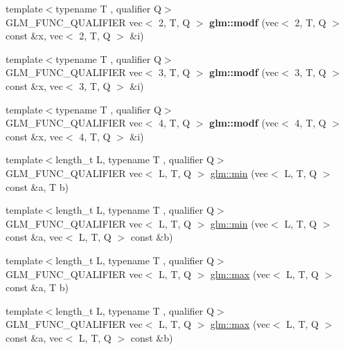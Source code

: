 \begin{DoxyCompactItemize}
\item 
\mbox{\label{func__common_8inl_a0c0ecf61b9a8f9f4d6f901b4e6542dca}} 
{\footnotesize template$<$typename T , qualifier Q$>$ }\\G\+L\+M\+\_\+\+F\+U\+N\+C\+\_\+\+Q\+U\+A\+L\+I\+F\+I\+ER vec$<$ 2, T, Q $>$ {\bfseries glm\+::modf} (vec$<$ 2, T, Q $>$ const \&x, vec$<$ 2, T, Q $>$ \&i)
\item 
\mbox{\label{func__common_8inl_a80404a2674e2aa9d6f3966e56bcdfbbf}} 
{\footnotesize template$<$typename T , qualifier Q$>$ }\\G\+L\+M\+\_\+\+F\+U\+N\+C\+\_\+\+Q\+U\+A\+L\+I\+F\+I\+ER vec$<$ 3, T, Q $>$ {\bfseries glm\+::modf} (vec$<$ 3, T, Q $>$ const \&x, vec$<$ 3, T, Q $>$ \&i)
\item 
\mbox{\label{func__common_8inl_a415c6e0838a276a74f7ad598ff57befb}} 
{\footnotesize template$<$typename T , qualifier Q$>$ }\\G\+L\+M\+\_\+\+F\+U\+N\+C\+\_\+\+Q\+U\+A\+L\+I\+F\+I\+ER vec$<$ 4, T, Q $>$ {\bfseries glm\+::modf} (vec$<$ 4, T, Q $>$ const \&x, vec$<$ 4, T, Q $>$ \&i)
\item 
{\footnotesize template$<$length\+\_\+t L, typename T , qualifier Q$>$ }\\G\+L\+M\+\_\+\+F\+U\+N\+C\+\_\+\+Q\+U\+A\+L\+I\+F\+I\+ER vec$<$ L, T, Q $>$ \hyperlink{group__core__func__common_ga2d274e8b537c173dba983331a2620736}{glm\+::min} (vec$<$ L, T, Q $>$ const \&a, T b)
\item 
{\footnotesize template$<$length\+\_\+t L, typename T , qualifier Q$>$ }\\G\+L\+M\+\_\+\+F\+U\+N\+C\+\_\+\+Q\+U\+A\+L\+I\+F\+I\+ER vec$<$ L, T, Q $>$ \hyperlink{group__core__func__common_ga734a374ca5c808e7bd9f74b6acfd7478}{glm\+::min} (vec$<$ L, T, Q $>$ const \&a, vec$<$ L, T, Q $>$ const \&b)
\item 
{\footnotesize template$<$length\+\_\+t L, typename T , qualifier Q$>$ }\\G\+L\+M\+\_\+\+F\+U\+N\+C\+\_\+\+Q\+U\+A\+L\+I\+F\+I\+ER vec$<$ L, T, Q $>$ \hyperlink{group__core__func__common_gae8b0964d30deabd0867b8d7ac44f067e}{glm\+::max} (vec$<$ L, T, Q $>$ const \&a, T b)
\item 
{\footnotesize template$<$length\+\_\+t L, typename T , qualifier Q$>$ }\\G\+L\+M\+\_\+\+F\+U\+N\+C\+\_\+\+Q\+U\+A\+L\+I\+F\+I\+ER vec$<$ L, T, Q $>$ \hyperlink{group__core__func__common_gad48b723358c68d45477c22ff0101985e}{glm\+::max} (vec$<$ L, T, Q $>$ const \&a, vec$<$ L, T, Q $>$ const \&b)

\end{DoxyCompactItemize}
